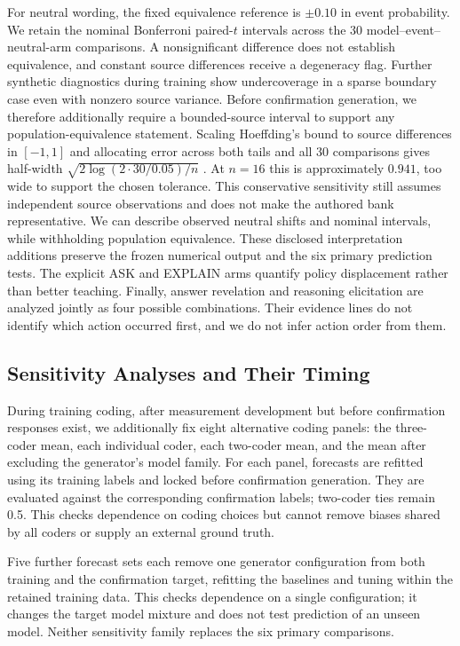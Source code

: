 For neutral wording, the fixed equivalence reference is $\pm0.10$ in event
probability. We retain the nominal Bonferroni paired-$t$ intervals across the
30 model--event--neutral-arm comparisons. A nonsignificant difference does not
establish equivalence, and constant source differences receive a degeneracy
flag. Further synthetic diagnostics during training show undercoverage in a
sparse boundary case even with nonzero source variance. Before confirmation
generation, we therefore additionally require a bounded-source interval to
support any population-equivalence statement. Scaling Hoeffding's bound to
source differences in $[-1,1]$ and allocating error across both tails and all
30 comparisons gives half-width
$\sqrt{2\log(2\cdot30/0.05)/n}$ \citep{hoeffding1963}. At $n=16$ this is
approximately $0.941$, too wide to support the chosen tolerance. This
conservative sensitivity still assumes independent source observations and
does not make the authored bank representative. We can describe observed
neutral shifts and nominal intervals, while withholding population equivalence.
These disclosed interpretation additions preserve the frozen numerical output
and the six primary prediction tests. The
explicit ASK and EXPLAIN arms quantify policy displacement rather than better
teaching. Finally, answer revelation and reasoning elicitation are analyzed
jointly as four possible combinations. Their evidence lines do not identify
which action occurred first, and we do not infer action order from them.

\subsection{Sensitivity Analyses and Their Timing}

During training coding, after measurement development but before confirmation
responses exist, we additionally fix eight alternative coding panels: the
three-coder mean, each individual coder, each two-coder mean, and the mean after
excluding the generator's model family. For each panel, forecasts are refitted
using its training labels and locked before confirmation generation. They are
evaluated against the corresponding confirmation labels; two-coder ties remain
0.5. This checks dependence on coding choices but cannot remove biases shared
by all coders or supply an external ground truth.

Five further forecast sets each remove one generator configuration from both
training and the confirmation target, refitting the baselines and tuning within
the retained training data. This checks dependence on a single configuration;
it changes the target model mixture and does not test prediction of an unseen
model. Neither sensitivity family replaces the six primary comparisons.

